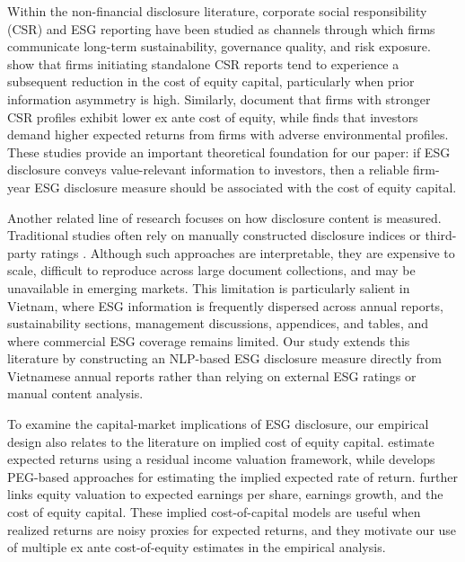 \documentclass{article}
\theoremstyle{plain}
\theoremstyle{definition}
\theoremstyle{remark}
\begin{document}
Within the non-financial disclosure literature, corporate social responsibility (CSR) and ESG reporting have been studied as channels through which firms communicate long-term sustainability, governance quality, and risk exposure. \citet{dhaliwal2011voluntary} show that firms initiating standalone CSR reports tend to experience a subsequent reduction in the cost of equity capital, particularly when prior information asymmetry is high. 
Similarly, \citet{elghoul2011csr} document that firms with stronger CSR profiles exhibit lower ex ante cost of equity, while \citet{chava2014environmental} finds that investors demand higher expected returns from firms with adverse environmental profiles. 
These studies provide an important theoretical foundation for our paper: if ESG disclosure conveys value-relevant information to investors, then a reliable firm-year ESG disclosure measure should be associated with the cost of equity capital.

Another related line of research focuses on how disclosure content is measured. Traditional studies often rely on manually constructed disclosure indices or third-party ratings \citep{botosan1997disclosure,clarkson2008environmental}. 
Although such approaches are interpretable, they are expensive to scale, difficult to reproduce across large document collections, and may be unavailable in emerging markets. 
This limitation is particularly salient in Vietnam, where ESG information is frequently dispersed across annual reports, sustainability sections, management discussions, appendices, and tables, and where commercial ESG coverage remains limited. 
Our study extends this literature by constructing an NLP-based ESG disclosure measure directly from Vietnamese annual reports rather than relying on external ESG ratings or manual content analysis.

To examine the capital-market implications of ESG disclosure, our empirical design also relates to the literature on implied cost of equity capital. 
\citet{gebhardt2001toward} estimate expected returns using a residual income valuation framework, while \citet{easton2004pe} develops PEG-based approaches for estimating the implied expected rate of return. 
\citet{ohlson2005expected} further links equity valuation to expected earnings per share, earnings growth, and the cost of equity capital. 
These implied cost-of-capital models are useful when realized returns are noisy proxies for expected returns, and they motivate our use of multiple ex ante cost-of-equity estimates in the empirical analysis.
\end{document}

